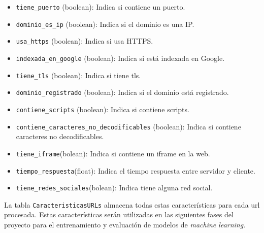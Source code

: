 \begin{itemize}
    \item \texttt{tiene\_puerto} (boolean): Indica si contiene un puerto.
    \item \texttt{dominio\_es\_ip} (boolean): Indica si el dominio es una IP.
    \item \texttt{usa\_https} (boolean): Indica si usa HTTPS.
    \item \texttt{indexada\_en\_google} (boolean): Indica si está indexada en Google.
    \item \texttt{tiene\_tls} (boolean): Indica si tiene \gls{tls}.
    \item \texttt{dominio\_registrado} (boolean): Indica si el dominio está registrado.
    \item \texttt{contiene\_scripts} (boolean): Indica si contiene scripts.
    \item \texttt{contiene\_caracteres\_no\_decodificables} (boolean): Indica si contiene caracteres no decodificables.
    \item \texttt{tiene\_iframe}(bolean): Indica si contiene un iframe en la web.
    \item \texttt{tiempo\_respuesta}(float): Indica el tiempo respuesta entre servidor y cliente.
    \item \texttt{tiene\_redes\_sociales}(bolean): Indica tiene alguna red social.
\end{itemize}

La tabla \texttt{CaracteristicasURLs} almacena todas estas características para cada \gls{url} procesada. Estas características serán utilizadas en las siguientes fases del proyecto para el entrenamiento y evaluación de modelos de \textit{machine learning}.
